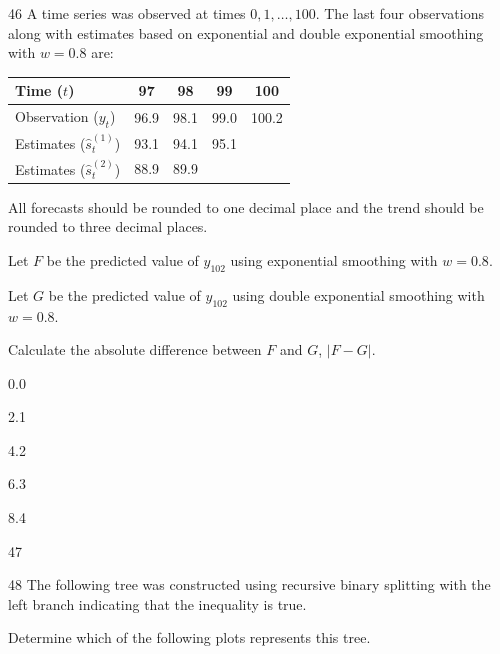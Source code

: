 \begin{question}{46}
A time series was observed at times $0, 1, \ldots, 100$. The last four observations along with estimates based on exponential and double exponential smoothing with $w = 0.8$ are:
\begin{center}
\begin{tabular}{|l|c|c|c|c|}
\hline
Time ($t$) & 97 & 98 & 99 & 100 \\ \hline
Observation ($y_t$) & 96.9 & 98.1 & 99.0 & 100.2 \\ \hline
Estimates ($\hat{s}^{(1)}_t$) & 93.1 & 94.1 & 95.1 & \\ \hline
Estimates ($\hat{s}^{(2)}_t$) & 88.9 & 89.9 & & \\ \hline
\end{tabular}
\end{center}

All forecasts should be rounded to one decimal place and the trend should be rounded to three decimal places.

Let $F$ be the predicted value of $y_{102}$ using exponential smoothing with $w = 0.8$.

Let $G$ be the predicted value of $y_{102}$ using double exponential smoothing with $w = 0.8$.

Calculate the absolute difference between $F$ and $G$, $|F - G|$.

\begin{choices}
\item 0.0
\item 2.1
\item 4.2
\item 6.3
\item 8.4
\end{choices}
\end{question}

\begin{question}{47}
\deleted
\end{question}

\begin{question}{48}
The following tree was constructed using recursive binary splitting with the left branch indicating that the inequality is true.


Determine which of the following plots represents this tree.

\begin{choices}
\item {}
\item {}
\item {}
\item {}
\item {}
\end{choices}
\end{question}

